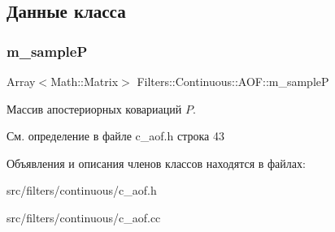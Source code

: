 \subsection{Данные класса}
\hypertarget{class_filters_1_1_continuous_1_1_a_o_f_a3cff90f7e12e677f04102f1717ef7a49}{}\label{class_filters_1_1_continuous_1_1_a_o_f_a3cff90f7e12e677f04102f1717ef7a49} 
\subsubsection{\texorpdfstring{m\+\_\+sampleP}{m\_sampleP}}
{\footnotesize\ttfamily Array$<$Math\+::\+Matrix$>$ Filters\+::\+Continuous\+::\+A\+O\+F\+::m\+\_\+sampleP\hspace{0.3cm}{\ttfamily [protected]}}

Массив апостериорных ковариаций $P$. 

См. определение в файле c\+\_\+aof.\+h строка 43



Объявления и описания членов классов находятся в файлах\+:\begin{DoxyCompactItemize}
\item 
src/filters/continuous/c\+\_\+aof.\+h\item 
src/filters/continuous/c\+\_\+aof.\+cc\end{DoxyCompactItemize}
